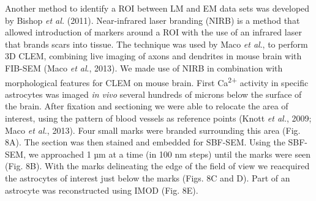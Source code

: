 \documentclass{article}
\begin{document}
Another method to identify a ROI between LM and EM data sets was developed by Bishop \textit{et al.} (2011). Near-infrared laser branding (NIRB) is a method that allowed introduction of markers around a ROI with the use of an infrared laser that brands scars into tissue. The technique was used by Maco \textit{et al}., to perform 3D CLEM, combining live imaging of axons and dendrites in mouse brain with FIB-SEM (Maco \textit{et al}., 2013). We made use of NIRB in combination with morphological features for CLEM on mouse brain. First Ca\textsuperscript{2+} activity in specific astrocytes was imaged \textit{in vivo} several hundreds of microns below the surface of the brain. After fixation and sectioning we were able to relocate the area of interest, using the pattern of blood vessels as reference points (Knott \textit{et al.}, 2009; Maco \textit{et al.}, 2013). Four small marks were branded surrounding this area (Fig. 8A). The section was then stained and embedded for SBF-SEM. Using the SBF-SEM, we approached 1 µm at a time (in 100 nm steps) until the marks were seen (Fig. 8B). With the marks delineating the edge of the field of view we reacquired the astrocytes of interest just below the marks (Figs. 8C and D). Part of an astrocyte was reconstructed using IMOD (Fig. 8E).
\end{document}
